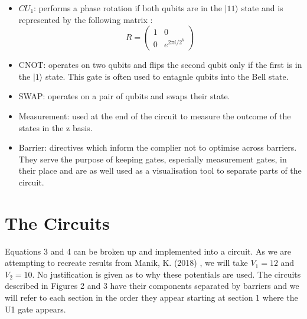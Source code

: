 \documentclass{article}
\begin{document}
\begin{itemize}[labelindent=1.5em,labelsep=0.9cm,leftmargin=*]
	\item{} {} {} {} {}  $CU_1$: performs a phase rotation if both qubits are in the $|11\rangle$ state and is represented by the following matrix \cite{qiskit}:
	\[R = \left(\begin{array}{cc}{1} & {0} \\ {0} & {e^{2 \pi i / 2^{k}}}\end{array}\right)\]
	\item{}  {} {} {} {}  CNOT: operates on two qubits and flips the second qubit only if the first is in the $|1\rangle$ state. This gate is often used to entagnle qubits into the Bell state.
	\item{} {} {} {} {}  SWAP: operates on a pair of qubits and swaps their state.
    \item{} {} {} {} {} Measurement: used at the end of the circuit to measure the outcome of the states in the z basis.
    \item{} {} {} {} {} Barrier: directives which inform the complier not to optimise across barriers. They serve the purpose of keeping gates, especially measurement gates, in their place and are as well used as a visualisation tool to separate parts of the circuit.
\end{itemize}


\section{The Circuits}
Equations 3 and 4 can be broken up and implemented into a circuit. As we are attempting to recreate results from Manik, K. (2018) \cite{manik}, we will take $V_1 = 12$ and $V_2 = 10$. No justification is given as to why these potentials are used. The circuits described in Figures 2 and 3 have their components separated by barriers and we will refer to each section in the order they appear starting at section 1 where the U1 gate appears. 
\end{document}
